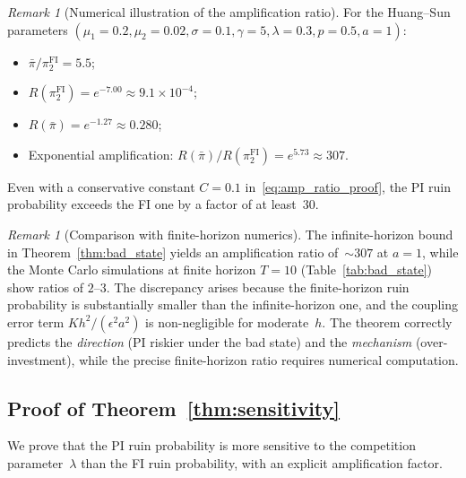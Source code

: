 \documentclass[12pt]{article}
\theoremstyle{remark}
\newtheorem{remark}[theorem]{Remark}
\theoremstyle{definition}
\newcommand{\FI}{\mathrm{FI}}
\begin{document}
\begin{remark}[Numerical illustration of the amplification ratio]
\label{rem:amp_numerical}
For the Huang--Sun parameters $(\mu_1 = 0.2, \mu_2 = 0.02, \sigma = 0.1,
\gamma = 5, \lambda = 0.3, p = 0.5, a = 1)$:
\begin{itemize}
\item $\bar{\pi}/\pi_2^{\FI} = 5.5$;
\item $R(\pi_2^{\FI}) = e^{-7.00} \approx 9.1 \times 10^{-4}$;
\item $R(\bar{\pi}) = e^{-1.27} \approx 0.280$;
\item Exponential amplification:
  $R(\bar{\pi})/R(\pi_2^{\FI}) = e^{5.73} \approx 307$.
\end{itemize}
Even with a conservative constant $C = 0.1$ in~\eqref{eq:amp_ratio_proof},
the PI ruin probability exceeds the FI one by a factor of at
least~$30$.
\end{remark}

\begin{remark}[Comparison with finite-horizon numerics]
\label{rem:finite_horizon}
The infinite-horizon bound in Theorem~\ref{thm:bad_state} yields an
amplification ratio of~$\sim 307$ at $a = 1$, while the Monte Carlo
simulations at finite horizon $T = 10$ (Table~\ref{tab:bad_state})
show ratios of $2$--$3$.
The discrepancy arises because the finite-horizon ruin probability is
substantially smaller than the infinite-horizon one, and the coupling error
term $K h^2/(\epsilon^2 a^2)$ is non-negligible for moderate~$h$.
The theorem correctly predicts the \emph{direction} (PI riskier under
the bad state) and the \emph{mechanism} (over-investment), while the
precise finite-horizon ratio requires numerical computation.
\end{remark}


\subsection{Proof of Theorem~\ref{thm:sensitivity}}\label{sec:proof_sensitivity}

We prove that the PI ruin probability is more sensitive to the competition
parameter~$\lambda$ than the FI ruin probability, with an explicit
amplification factor.
\end{document}

